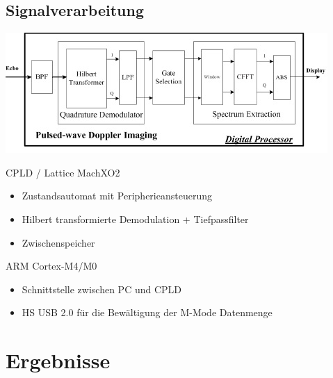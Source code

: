 \documentclass{beamer}
\begin{document}
\subsection{Signalverarbeitung}
\begin{frame}
\includegraphics[width=\textwidth]{images/Praesentation/imaging}
\end{frame}

\begin{frame}
	\begin{block}{CPLD / Lattice MachXO2}
		\begin{itemize}
			\item Zustandsautomat mit Peripherieansteuerung
			\item Hilbert transformierte Demodulation + Tiefpassfilter
			\item Zwischenspeicher
		\end{itemize}
	\end{block}
	\begin{block}{ARM Cortex-M4/M0}
		\begin{itemize}
		\item Schnittstelle zwischen PC und CPLD
		\item HS USB 2.0 für die Bewältigung der M-Mode Datenmenge%
		\end{itemize}
	\end{block}
\end{frame}


\section{Ergebnisse}
\end{document}
